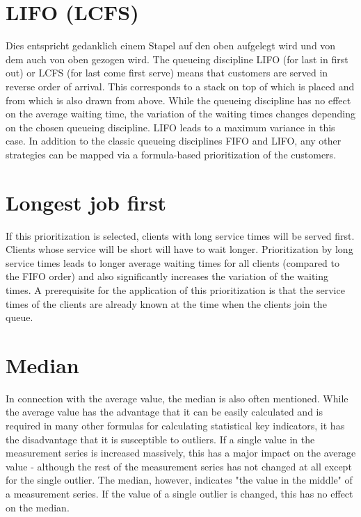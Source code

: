 \section*{LIFO (LCFS)}


Dies entspricht gedanklich einem Stapel auf den oben aufgelegt wird und von dem auch von oben gezogen wird.
The queueing discipline LIFO (for last in first out) or LCFS (for last come first serve) means
that customers are served in reverse order of arrival. This corresponds to a stack on top of which is
placed and from which is also drawn from above. While the queueing discipline has no effect on the
average waiting time, the variation of the waiting times changes depending on the chosen queueing discipline.
LIFO leads to a maximum variance in this case. In addition to the classic queueing disciplines
FIFO and LIFO, any other strategies can be mapped via a formula-based prioritization of the customers.

\section*{Longest job first}


If this prioritization is selected, clients with long service times will be served first.
Clients whose service will be short will have to wait longer. Prioritization by long
service times leads to longer average waiting times for all clients (compared to the
FIFO order) and also significantly increases the variation of the waiting times.
A prerequisite for the application of this prioritization is that the service times
of the clients are already known at the time when the clients join the queue.

\section*{Median}


In connection with the average value,
the median is also often mentioned. While the average value has the advantage
that it can be easily calculated and is required in many other formulas for
calculating statistical key indicators, it has the disadvantage that it is
susceptible to outliers. If a single value in the measurement series is
increased massively, this has a major impact on the average value - although
the rest of the measurement series has not changed at all except for the
single outlier. The median, however, indicates "the value in the middle"
of a measurement series. If the value of a single outlier is changed,
this has no effect on the median.

